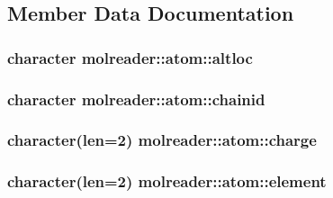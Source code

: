\subsection{Member Data Documentation}
\hypertarget{structmolreader_1_1atom_a6bed152132fdfceaf62c2627edd94419}{
\subsubsection[{altloc}]{\setlength{\rightskip}{0pt plus 5cm}character molreader\+::atom\+::altloc\hspace{0.3cm}{\ttfamily [private]}}}\label{structmolreader_1_1atom_a6bed152132fdfceaf62c2627edd94419}
\hypertarget{structmolreader_1_1atom_a40d33bfe323c5ba4969637d03f6f23c1}{
\subsubsection[{chainid}]{\setlength{\rightskip}{0pt plus 5cm}character molreader\+::atom\+::chainid\hspace{0.3cm}{\ttfamily [private]}}}\label{structmolreader_1_1atom_a40d33bfe323c5ba4969637d03f6f23c1}
\hypertarget{structmolreader_1_1atom_a2df0e8e4929647a81fce9d7ce76390cb}{
\subsubsection[{charge}]{\setlength{\rightskip}{0pt plus 5cm}character(len=2) molreader\+::atom\+::charge\hspace{0.3cm}{\ttfamily [private]}}}\label{structmolreader_1_1atom_a2df0e8e4929647a81fce9d7ce76390cb}
\hypertarget{structmolreader_1_1atom_a34e74d1598af7abd98aa9323ae538634}{
\subsubsection[{element}]{\setlength{\rightskip}{0pt plus 5cm}character(len=2) molreader\+::atom\+::element\hspace{0.3cm}{\ttfamily [private]}}}\label{structmolreader_1_1atom_a34e74d1598af7abd98aa9323ae538634}
